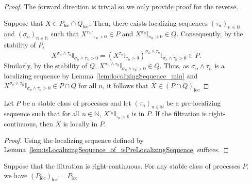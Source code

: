 \begin{proof}  
The forward direction is trivial so we only provide proof for the reverse.

Suppose that $X \in P_{\mathrm{loc}}\cap Q_{\mathrm{loc}}$. Then, there exists localizing sequences $(\tau_n)_{n \in \mathbb{N}}$ and $(\sigma_n)_{n \in \mathbb{N}}$ such that $X^{\tau_n} \mathbb{I}_{\tau_n > 0}\in P$ and $X^{\sigma_n} \mathbb{I}_{\sigma_n > 0} \in Q$. Consequently, by the stability of $P$,
\[X^{\sigma_n \wedge \tau_n} \mathbb{I}_{\sigma_n \wedge \tau_n > 0} = (X^{\tau_n} \mathbb{I}_{\tau_n > 0})^{\sigma_n \wedge \tau_n} \mathbb{I}_{\sigma_n \wedge \tau_n > 0} \in P.\]
Similarly, by the stability of $Q$, $X^{\sigma_n \wedge \tau_n} \mathbb{I}_{\sigma_n \wedge \tau_n > 0} \in Q$. Thus, as $\sigma_n \wedge \tau_n$ is a localizing sequence by Lemma~\ref{lem:localizingSequence_min} and $X^{\sigma_n \wedge \tau_n} \mathbb{I}_{\sigma_n \wedge \tau_n > 0} \in P \cap Q$ for all $n$, it follows that $X \in (P \cap Q)_{\mathrm{loc}}$
\end{proof}


\begin{lemma}\label{lem:locally_of_isPreLocalizingSequence}
  \mathlibok
Let $P$ be a stable class of processes and let $(\tau_n)_{n \in \mathbb{N}}$ be a pre-localizing sequence such that for all $n \in \mathbb{N}$, $X^{\tau_n}\mathbb{I}_{\tau_n > 0}$ is in $P$.
If the filtration is right-continuous, then $X$ is locally in $P$.
\end{lemma}

\begin{proof}  
  Using the localizing sequence defined by Lemma~\ref{lem:isLocalizingSequence_of_isPreLocalizingSequence} suffices.
\end{proof}


\begin{lemma}\label{lem:locally_locally}
  \mathlibok
Suppose that the filtration is right-continuous.
For any stable class of processes $P$, we have $(P_{\mathrm{loc}})_{\mathrm{loc}} = P_{\mathrm{loc}}$.
\end{lemma}

